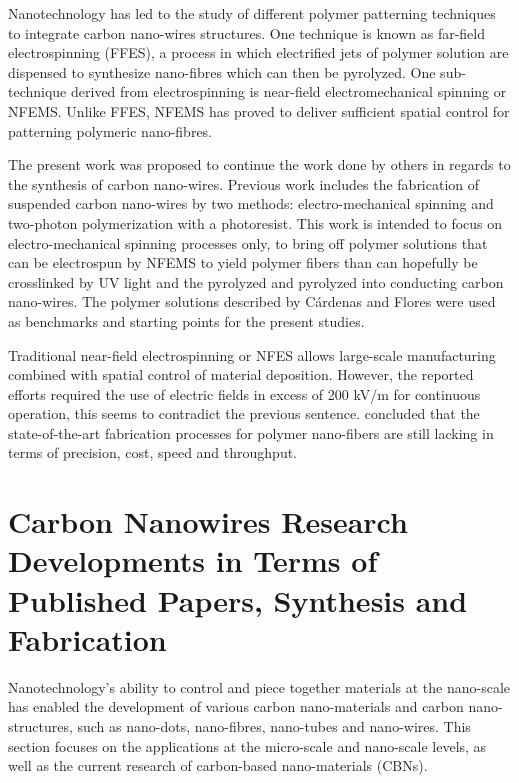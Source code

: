 Nanotechnology has led to the study of different polymer patterning techniques to integrate carbon nano-wires structures. One technique is known as far-field electrospinning (FFES), a process in which electrified jets of polymer solution are dispensed to synthesize nano-fibres which can then be pyrolyzed. One sub-technique derived from electrospinning is near-field electromechanical spinning or NFEMS. Unlike FFES, NFEMS has proved to deliver sufficient spatial control for patterning polymeric nano-fibres. \cite{Cardenas2017}

The present work was proposed to continue the work done by others \cite{Cardenas2017, Flores2017} in regards to the synthesis of carbon nano-wires. Previous work includes the fabrication of suspended carbon nano-wires by two methods: electro-mechanical spinning and two-photon polymerization with a photoresist. \cite{Cardenas2017, Flores2017} This work is intended to focus on electro-mechanical spinning processes only, to bring off polymer solutions that can be electrospun by NFEMS to yield polymer fibers than can hopefully be crosslinked by UV light and the pyrolyzed and pyrolyzed into conducting carbon nano-wires. The polymer solutions described by Cárdenas and Flores \cite{Flores2017, Cardenas2017} were used as benchmarks and starting points for the present studies.

Traditional near-field electrospinning or NFES allows large-scale manufacturing combined with spatial control of material deposition. \cite{Madou2011} However, the reported efforts required the use of electric fields in excess of 200 kV/m for continuous operation, this seems to contradict the previous sentence. \cite{Madou2011} concluded that the state-of-the-art fabrication processes for polymer nano-fibers are still lacking in terms of precision, cost, speed and throughput.

\section{Carbon Nanowires Research Developments in Terms of Published Papers, Synthesis and Fabrication}


Nanotechnology's ability to control and piece together materials at the nano-scale has enabled the development of various carbon nano-materials and carbon nano-structures, such as nano-dots, nano-fibres, nano-tubes and nano-wires. \cite{Posthuma-Trumpie2012, Zhang2009, DeVolder2011, Cao2011} This section focuses on the applications at the micro-scale and nano-scale levels, as well as the current research of carbon-based nano-materials (CBNs).

